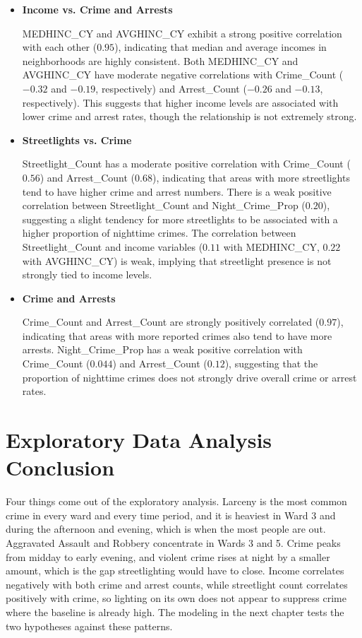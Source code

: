 \documentclass{report}
\begin{document}
\begin{itemize}
\item \textbf{Income vs. Crime and Arrests}
  \par MEDHINC\_CY and AVGHINC\_CY exhibit a strong positive correlation with each other ($0.95$), indicating that median and average incomes in neighborhoods are highly consistent. Both MEDHINC\_CY and AVGHINC\_CY have moderate negative correlations with Crime\_Count ($-0.32$ and $-0.19$, respectively) and Arrest\_Count ($-0.26$ and $-0.13$, respectively). This suggests that higher income levels are associated with lower crime and arrest rates, though the relationship is not extremely strong.
\item \textbf{Streetlights vs. Crime}
  \par Streetlight\_Count has a moderate positive correlation with Crime\_Count ($0.56$) and Arrest\_Count ($0.68$), indicating that areas with more streetlights tend to have higher crime and arrest numbers. There is a weak positive correlation between Streetlight\_Count and Night\_Crime\_Prop ($0.20$), suggesting a slight tendency for more streetlights to be associated with a higher proportion of nighttime crimes. The correlation between Streetlight\_Count and income variables ($0.11$ with MEDHINC\_CY, $0.22$ with AVGHINC\_CY) is weak, implying that streetlight presence is not strongly tied to income levels.
\item \textbf{Crime and Arrests}
  \par Crime\_Count and Arrest\_Count are strongly positively correlated ($0.97$), indicating that areas with more reported crimes also tend to have more arrests. Night\_Crime\_Prop has a weak positive correlation with Crime\_Count ($0.044$) and Arrest\_Count ($0.12$), suggesting that the proportion of nighttime crimes does not strongly drive overall crime or arrest rates.
\end{itemize}

\section{Exploratory Data Analysis Conclusion}
\par Four things come out of the exploratory analysis. Larceny is the most common crime in every ward and every time period, and it is heaviest in Ward 3 and during the afternoon and evening, which is when the most people are out. Aggravated Assault and Robbery concentrate in Wards 3 and 5. Crime peaks from midday to early evening, and violent crime rises at night by a smaller amount, which is the gap streetlighting would have to close. Income correlates negatively with both crime and arrest counts, while streetlight count correlates positively with crime, so lighting on its own does not appear to suppress crime where the baseline is already high. The modeling in the next chapter tests the two hypotheses against these patterns.
\end{document}
